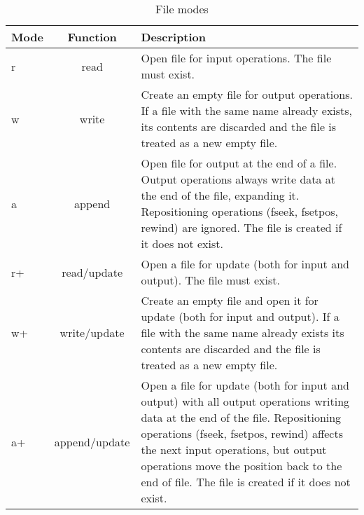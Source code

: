 \documentclass[12pt,a4paper]{article}
\begin{document}
\begin{table}[H]
\begin{center}
\vspace{0.3cm}
	\begin{tabular}{lcp{10cm}}
	\hline \hline
		\textbf{Mode} \rule{0pt}{2.6ex} & \textbf{Function} & \textbf{Description}\\
		\hline
		r \rule{0pt}{2.6ex} & read & Open file for input operations. The file must exist.\\
		w & write & Create an empty file for output operations. If a file with the same name already exists, its contents are discarded and the file is treated as a new empty file.\\
		a & append & Open file for output at the end of a file. Output operations always write data at the end of the file, expanding it. Repositioning operations (fseek, fsetpos, rewind) are ignored. The file is created if it does not exist.\\
		r+ & read/update & Open a file for update (both for input and output). The file must exist.\\
		w+ & write/update & Create an empty file and open it for update (both for input and output). If a file with the same name already exists its contents are discarded and the file is treated as a new empty file.\\
		a+ & append/update & Open a file for update (both for input and output) with all output operations writing data at the end of the file. Repositioning operations (fseek, fsetpos, rewind) affects the next input operations, but output operations move the position back to the end of file. The file is created if it does not exist.\\
	\hline \hline
	\end{tabular}
\end{center}
\label{FileModes}
\caption{File modes}
\end{table}
\end{document}
